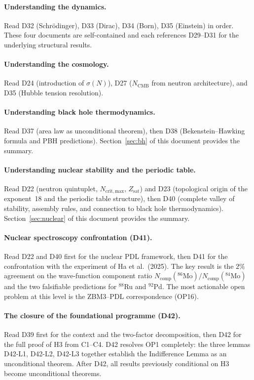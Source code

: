 \documentclass[11pt,a4paper]{article}
\theoremstyle{plain}
\theoremstyle{definition}
\theoremstyle{remark}
\newcommand{\sigmaN}{\sigma(N)}
\begin{document}
\paragraph{Understanding the dynamics.}
Read D32 (Schr\"odinger), D33 (Dirac), D34 (Born), D35 (Einstein) in order.
These four documents are self-contained and each references D29--D31 for the underlying structural results.

\paragraph{Understanding the cosmology.}
Read D24 (introduction of $\sigmaN$), D27 ($N_{\mathrm{CMB}}$ from neutron architecture), and D35 (Hubble tension resolution).

\paragraph{Understanding black hole thermodynamics.}
Read D37 (area law as unconditional theorem), then D38 (Bekenstein--Hawking formula and PBH predictions).
Section~\ref{sec:bh} of this document provides the summary.

\paragraph{Understanding nuclear stability and the periodic table.}
Read D22 (neutron quintuplet, $N_{\mathrm{crit,max}}$, $Z_{\mathrm{sat}}$) and D23 (topological origin of the exponent~18 and the periodic table structure), then D40 (complete valley of stability, assembly rules, and connection to black hole thermodynamics).
Section~\ref{sec:nuclear} of this document provides the summary.

\paragraph{Nuclear spectroscopy confrontation (D41).}
Read D22 and D40 first for the nuclear PDL framework, then D41 for the confrontation with the experiment of Ha et al.\ (2025).
The key result is the $2\%$ agreement on the wave-function component ratio $N_{\mathrm{comp}}(^{86}\text{Mo})/N_{\mathrm{comp}}(^{84}\text{Mo})$ and the two falsifiable predictions for $^{88}$Ru and $^{92}$Pd.
The most actionable open problem at this level is the ZBM3--PDL correspondence (OP16).

\paragraph{The closure of the foundational programme (D42).}
Read D39 first for the context and the two-factor decomposition, then D42 for the full proof of H3 from C1--C4. D42 resolves OP1 completely: the three lemmas D42-L1, D42-L2, D42-L3 together establish the Indifference Lemma as an unconditional theorem. After D42, all results previously conditional on H3 become unconditional theorems.
\end{document}
